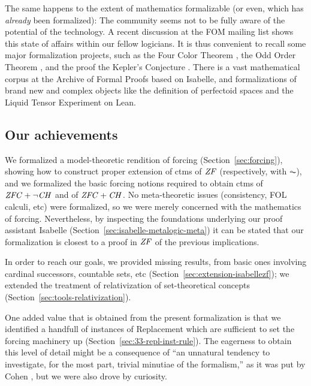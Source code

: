 The same happens to the extent of mathematics formalizable (or even,
which has \emph{already} been formalized): The community seems not to
be fully aware of the potential of the technology. A recent discussion
at the FOM mailing list shows this state of affairs within our fellow
logicians. It is thus convenient to recall
some major formalization projects, such as the Four Color Theorem
\cite{MR2463991}, the Odd Order Theorem
\cite{10.1007/978-3-642-39634-2_14}, and the proof the Kepler's
Conjecture \cite{MR3659768}. There is a vast mathematical corpus at
the Archive of Formal Proofs based on Isabelle, and formalizations of
brand new and complex objects like the definition of perfectoid spaces \cite{10.1145/3372885.3373830}
and the Liquid Tensor Experiment \cite{LTE2020,LTE2021} on Lean.

\subsection{Our achievements}
We formalized a model-theoretic rendition of forcing (Section~\ref{sec:forcing}), showing how to
construct proper extension of ctms of $\mathit{ZF}$ (respectively, with
$\AC$), and we formalized the basic forcing notions required to obtain
ctms of $\mathit{ZFC} + \neg\mathit{CH}$ and of $\mathit{ZFC} + \mathit{CH}$. No meta-theoretic issues
(consistency, FOL calculi, etc) were formalized, so we were merely
concerned with the mathematics of forcing. Nevertheless, by inspecting
the foundations underlying our proof assistant Isabelle
(Section~\ref{sec:isabelle-metalogic-meta}) it can be stated that our
formalization is closest to a proof in $\mathit{ZF}$ of the previous
implications.

In order to reach our goals, we provided missing results, from basic ones
involving cardinal successors, countable sets, etc
(Section~\ref{sec:extension-isabellezf}); we extended the treatment of relativization of
set-theoretical concepts (Section~\ref{sec:tools-relativization}).

One added value that is obtained from the present formalization is
that we identified a handfull of instances of Replacement which are
sufficient to set the forcing machinery up (Section~\ref{sec:33-repl-inst-rule}).
The eagerness to obtain this level of detail might be a consequence of
“an unnatural tendency to investigate, for the most part, trivial
minutiae of the formalism,” as it was put by Cohen
\cite{zbMATH02012060}, but we were also drove by curiosity.

